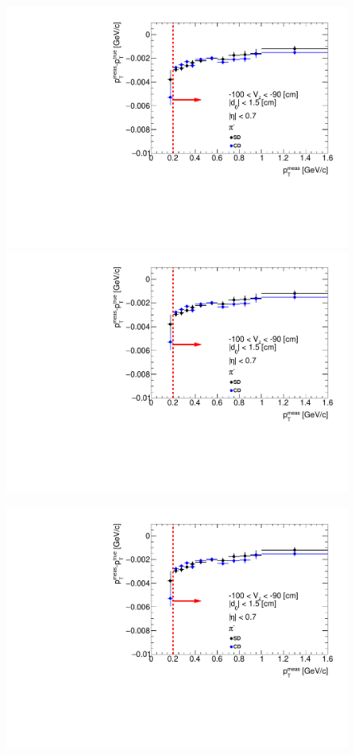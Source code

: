 \begin{figure}[H]
{  \includegraphics[width=\linewidth,page=93]{graphics/energyLoss/energyLoss3D_OnePrtAlso.pdf}\\
  \includegraphics[width=\linewidth,page=96]{graphics/energyLoss/energyLoss3D_OnePrtAlso.pdf}\\
}%
\parbox{0.329\textwidth}{
  \includegraphics[width=\linewidth,page=85]{graphics/energyLoss/energyLoss3D_OnePrtAlso.pdf}\\
}
\end{figure}
